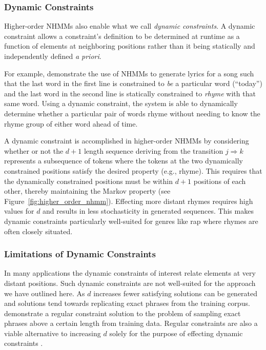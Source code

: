 \documentclass[phd,electronic,oneside,twosidetoc,letterpaper,chaptercenter,parttop,lof,lot]{byumsphd}
\begin{document}
\subsubsection{Dynamic Constraints}

Higher-order NHMMs also enable what we call \textit{dynamic constraints}. A dynamic constraint allows a constraint's definition to be determined at runtime as a function of elements at neighboring positions rather than it being statically and independently defined \textit{a priori}.

For example, \citeauthor{barbieri2012markov} \cite{barbieri2012markov} demonstrate the use of NHMMs to generate lyrics for a song such that the last word in the first line is constrained to \textit{be} a particular word (``today'') and the last word in the second line is statically constrained to \textit{rhyme} with that same word. Using a dynamic constraint, the system is able to dynamically determine whether a particular pair of words rhyme without needing to know the rhyme group of either word ahead of time.

A dynamic constraint is accomplished in higher-order NHMMs by considering whether or not the $d + 1$ length sequence deriving from the transition $j \Rightarrow k$ represents a subsequence of tokens where the tokens at the two dynamically constrained positions satisfy the desired property (e.g., rhyme). This requires that the dynamically constrained positions must be within $d+1$ positions of each other, thereby maintaining the Markov property (see Figure~\ref{fig:higher_order_nhmm}). Effecting more distant rhymes requires high values for $d$ and results in less stochasticity in generated sequences. This makes dynamic constraints particularly well-suited for genres like rap where rhymes are often closely situated.

\subsubsection{Limitations of Dynamic Constraints}

In many applications the dynamic constraints of interest relate elements at very distant positions. Such dynamic constraints are not well-suited for the approach we have outlined here. As $d$ increases fewer satisfying solutions can be generated and solutions tend towards replicating exact phrases from the training corpus. \citeauthor{papadopoulos2014avoiding} \cite{papadopoulos2014avoiding} demonstrate a regular constraint solution to the problem of sampling exact phrases above a certain length from training data. Regular constraints are also a viable alternative to increasing $d$ solely for the purpose of effecting dynamic constraints \cite{bodily2018relational}.
\end{document}
